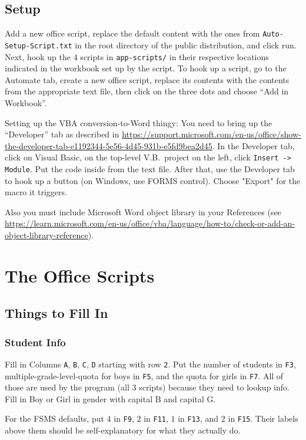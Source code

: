 \documentclass[openany,notitlepage]{book}
\begin{document}
	\section{Setup}
	
	Add a new office script, replace the default content with the ones from \verb|Auto-Setup-Script.txt| in the root
	directory of the public distribution, and click run. Next, hook up the $4$
	scripts in \verb|app-scripts/| in their respective locations indicated in the workbook set up by the script. To hook up a script, go to the Automate tab, create a new office script, replace its contents with the contents from the appropriate text file, then click on the three dots and choose ``Add in Workbook''.
	
	Setting up the VBA conversion-to-Word thingy: You need to bring up the ``Developer'' tab as described in
	\url{https://support.microsoft.com/en-us/office/show-the-developer-tab-e1192344-5e56-4d45-931b-e5fd9bea2d45}.
	In the Developer tab, click on Visual Basic, on the top-level V.B.\ project on the left, click \texttt{Insert -> Module}. Put the
	code inside from the text file. After that, use the Developer tab to hook up a button (on Windows, use FORMS control).
	Choose "Export" for the macro it triggers.
	
	Also you must include Microsoft Word object library in your References (see \url{https://learn.microsoft.com/en-us/office/vba/language/how-to/check-or-add-an-object-library-reference}).
	\chapter{The Office Scripts}
	\section{Things to Fill In}
	\subsection{Student Info}\label{inf}
	Fill in Columns \verb|A|, \verb|B|, \verb|C|, \verb|D| starting with row \verb|2|. Put the number of students in \verb|F3|,
	multiple-grade-level-quota for boys in \verb|F5|, and the quota for girls in \verb|F7|. All of those are used by the
	program (all $3$ scripts) because they need to lookup info. Fill in Boy or Girl in gender with capital B and capital G.
	
	For the FSMS defaults, put $4$ in \verb|F9|, $2$ in \verb|F11|, $1$ in \verb|F13|, and $2$ in \verb|F15|. Their labels above them
	should be self-explanatory for what they actually do.
\end{document}
